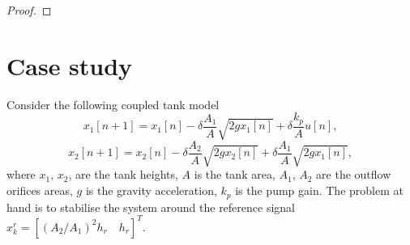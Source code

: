\documentclass[letterpaper, 10 pt, conference]{ieeeconf}
\begin{document}
\begin{proof}

\end{proof}


\section{Case study}
\label{sec:case}
Consider the following coupled tank model 
\begin{equation}
x_1[n+1] = x_1[n] - \delta\frac{A_1}{A} \sqrt{2 g x_1[n]} + \delta\frac{k_p}{A} u[n],
\end{equation}
\begin{equation}
x_2[n+1] = x_2[n] - \delta\frac{A_2}{A} \sqrt{2 g x_2[n]} + \delta\frac{A_1}{A} \sqrt{2 g x_1[n]}, 
\end{equation}
where $x_1$, $x_2$, are the tank heights, $A$ is the tank area, $A_1$, $A_2$ are the outflow orifices areas, $g$ is the gravity acceleration, $k_p$ is the pump gain. The problem at hand is to stabilise the system around the reference signal $x^r_k = [(A_2/A_1)^2h_r \quad h_r]^T$.
\end{document}
